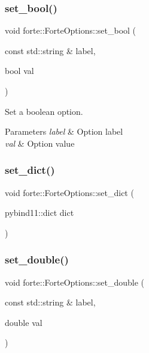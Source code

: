 \subsubsection{\texorpdfstring{set\+\_\+bool()}{set\_bool()}}
{\footnotesize\ttfamily void forte\+::\+Forte\+Options\+::set\+\_\+bool (\begin{DoxyParamCaption}\item[{const std\+::string \&}]{label,  }\item[{bool}]{val }\end{DoxyParamCaption})}



Set a boolean option. 


\begin{DoxyParams}{Parameters}
{\em label} & Option label \\
\hline
{\em val} & Option value \\
\hline
\end{DoxyParams}
\mbox{\label{classforte_1_1_forte_options_acb7f135b08d1ca37633b6a7aa29917cf}} 
\subsubsection{\texorpdfstring{set\+\_\+dict()}{set\_dict()}}
{\footnotesize\ttfamily void forte\+::\+Forte\+Options\+::set\+\_\+dict (\begin{DoxyParamCaption}\item[{pybind11\+::dict}]{dict }\end{DoxyParamCaption})\hspace{0.3cm}{\ttfamily [inline]}}

\mbox{\label{classforte_1_1_forte_options_aca265f33fa854251491eb37e7be9dd93}} 
\subsubsection{\texorpdfstring{set\+\_\+double()}{set\_double()}}
{\footnotesize\ttfamily void forte\+::\+Forte\+Options\+::set\+\_\+double (\begin{DoxyParamCaption}\item[{const std\+::string \&}]{label,  }\item[{double}]{val }\end{DoxyParamCaption})}



